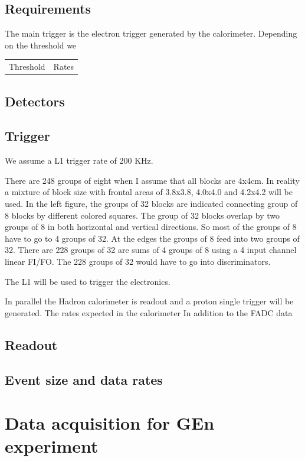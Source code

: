 \documentclass{article}
\begin{document}
\subsection{Requirements}
The main trigger is the electron trigger generated by the calorimeter.
Depending on the threshold we 
\begin{tabular}{|c|c|}
Threshold & Rates\\
\end{tabular}


\subsection{Detectors}



\subsection{Trigger}

We assume a L1 trigger rate of 200 KHz. 

There are 248 groups
of eight when I assume that all blocks are 4x4cm. In reality a mixture
of block size with frontal areas of 3.8x3.8, 4.0x4.0 and 4.2x4.2 will be
used. In the left figure, the groups of 32 blocks are indicated connecting
group of 8 blocks by different colored squares. The group of 32 blocks overlap
by two groups of 8 in both horizontal and vertical directions. So most of the
groups of 8 have to go to 4 groups of 32. At the edges the groups of 8 feed into
two groups of 32. There are 228  groups of 32 are sums of 4 groups of 8 using
a 4 input channel linear FI/FO. The 228 groups of 32 would have to
go into discriminators.

The L1 will be used to trigger the  electronics.

In parallel the Hadron calorimeter is readout and a proton single trigger will be generated.
The rates expected in the calorimeter
In addition to the FADC data

\subsection{Readout}

\subsection{Event size and data rates}
\section{Data acquisition for GEn experiment}
\end{document}
